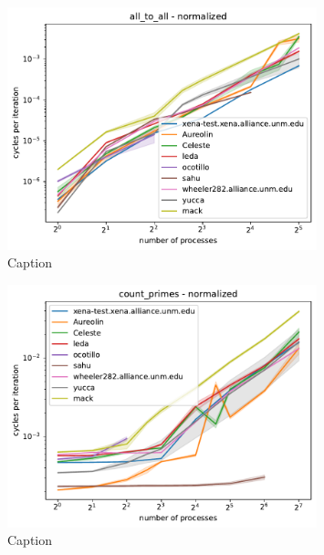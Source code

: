 \documentclass{article}
\begin{document}
\begin{figure}[h]
    \centering
    \includegraphics[width=0.8\textwidth]{figures/final/all_to_all_normalized.pdf}
    \caption{Caption}
    \label{fig:all_to_all_normalized}
\end{figure}

\begin{figure}[h]
    \centering
    \includegraphics[width=0.8\textwidth]{figures/final/count_primes_normalized.pdf}
    \caption{Caption}
    \label{fig:count_primes_normalized}
\end{figure}
\end{document}
